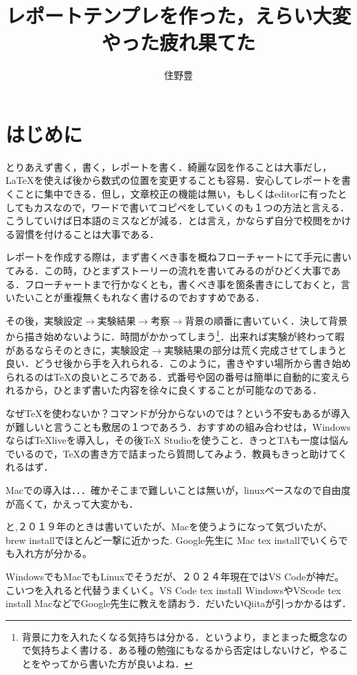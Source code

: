 \documentclass[12 pt,a4paper,autodetect-engine]{jsarticle}
\author{住野豊}%
\title{レポートテンプレを作った，えらい大変やった疲れ果てた} %
\begin{document}
\maketitle
\thispagestyle{empty}
\addtocounter{page}{-1}

\section{はじめに}
とりあえず書く，書く，レポートを書く．綺麗な図を作ることは大事だし，\LaTeX を使えば後から数式の位置を変更することも容易．安心してレポートを書くことに集中できる．但し，文章校正の機能は無い，もしくはeditorに有ったとしてもカスなので，ワードで書いてコピペをしていくのも１つの方法と言える．こうしていけば日本語のミスなどが減る．とは言え，かならず自分で校閲をかける習慣を付けることは大事である．

レポートを作成する際は，まず書くべき事を概ねフローチャートにて手元に書いてみる．この時，ひとまずストーリーの流れを書いてみるのがひどく大事である．フローチャートまで行かなくとも，書くべき事を箇条書きにしておくと，言いたいことが重複無くもれなく書けるのでおすすめである．

その後，実験設定$\rightarrow$実験結果$\rightarrow$考察$\rightarrow$背景の順番に書いていく．決して背景から描き始めないように．時間がかかってしまう\footnote{背景に力を入れたくなる気持ちは分かる．というより，まとまった概念なので気持ちよく書ける．ある種の勉強にもなるから否定はしないけど，やることをやってから書いた方が良いよね．}．出来れば実験が終わって暇があるならそのときに，実験設定$\rightarrow$実験結果の部分は荒く完成させてしまうと良い．どうせ後から手を入れられる．このように，書きやすい場所から書き始められるのはTeXの良いところである．式番号や図の番号は簡単に自動的に変えられるから，ひとまず書いた内容を徐々に良くすることが可能なのである．

なぜTeXを使わないか？コマンドが分からないのでは？という不安もあるが導入が難しいと言うことも敷居の１つであろう．おすすめの組み合わせは，WindowsならばTeXliveを導入し，その後TeX Studioを使うこと．きっとTAも一度は悩んでいるので，TeXの書き方で詰まったら質問してみよう．教員もきっと助けてくれるはず．

Macでの導入は．．．確かそこまで難しいことは無いが，linuxベースなので自由度が高くて，かえって大変かも．

と,２０１９年のときは書いていたが、Macを使うようになって気づいたが、brew installでほとんど一撃に近かった. Google先生に Mac tex installでいくらでも入れ方が分かる。

WindowsでもMacでもLinuxでそうだが、２０２４年現在ではVS Codeが神だ。こいつを入れると代替うまくいく。VS Code tex install WindowsやVScode tex install MacなどでGoogle先生に教えを請おう．だいたいQiitaが引っかかるはず．
\end{document}
